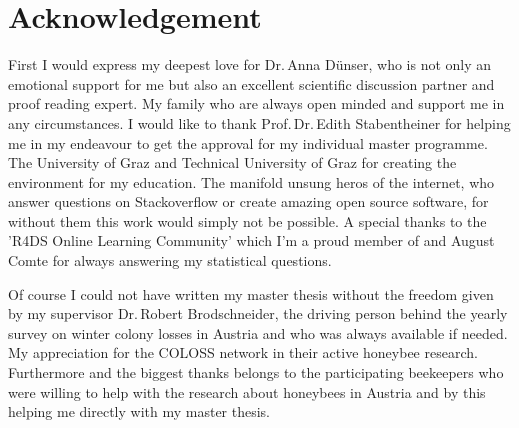\chapter*{Acknowledgement}
\label{sec:acknowledgement}
\vspace*{-10mm}

First I would express my deepest love for Dr.\,Anna Dünser, who is not only an emotional support for me but also an excellent scientific discussion partner and proof reading expert. My family who are always open minded and support me in any circumstances. I would like to thank Prof.\,Dr.\,Edith Stabentheiner for helping me in my endeavour to get the approval for my individual master programme. The University of Graz and Technical University of Graz for creating the environment for my education. The manifold unsung heros of the internet, who answer questions on Stackoverflow or create amazing open source software, for without them this work would simply not be possible. A special thanks to the 'R4DS Online Learning Community' which I'm a proud member of and August Comte for always answering my statistical questions.

Of course I could not have written my master thesis without the freedom given by my supervisor Dr.\,Robert Brodschneider, the driving person behind the yearly survey on winter colony losses in Austria and who was always available if needed. My appreciation for the COLOSS network in their active honeybee research. Furthermore and the biggest thanks belongs to the participating beekeepers who were willing to help with the research about honeybees in Austria and by this helping me directly with my master thesis.